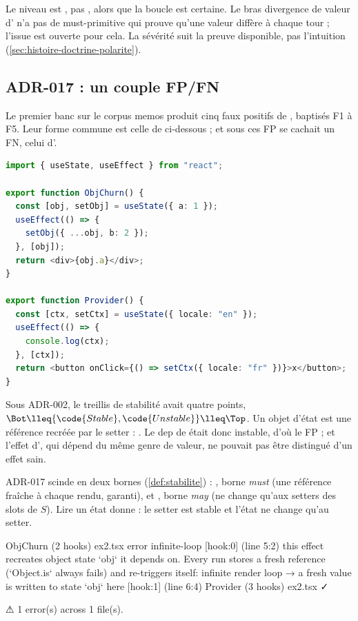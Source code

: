 \begin{remarque}
Le niveau est \Warning, pas \Error, alors que la boucle est certaine. Le bras \og divergence de valeur\fg{} d' n'a pas de must-primitive qui prouve qu'une valeur diffère à chaque tour ; l'issue  est ouverte pour cela. La sévérité suit la preuve disponible, pas l'intuition (\cref{sec:histoire-doctrine-polarite}).
\end{remarque}

\subsection{ADR-017 : un couple FP/FN}

Le premier banc sur le corpus \og memos\fg{} produit cinq faux positifs de , baptisés F1 à F5. Leur forme commune est celle de  ci-dessous ; et sous ces FP se cachait un FN, celui d'.

\begin{lstlisting}[language=TypeScript,caption={\file{/tmp/ch26/ex2.tsx}}]
import { useState, useEffect } from "react";

export function ObjChurn() {
  const [obj, setObj] = useState({ a: 1 });
  useEffect(() => {
    setObj({ ...obj, b: 2 });
  }, [obj]);
  return <div>{obj.a}</div>;
}

export function Provider() {
  const [ctx, setCtx] = useState({ locale: "en" });
  useEffect(() => {
    console.log(ctx);
  }, [ctx]);
  return <button onClick={() => setCtx({ locale: "fr" })}>x</button>;
}
\end{lstlisting}

Sous ADR-002, le treillis de stabilité avait quatre points, $\Bot \lleq \{\code{Stable}, \code{Unstable}\} \lleq \Top$. Un objet d'état est une référence recréée par le setter : . Le dep  de  était donc \og instable\fg{}, d'où le FP ; et l'effet d', qui dépend du même genre de valeur, ne pouvait pas être distingué d'un effet sain.

ADR-017 scinde  en deux bornes (\cref{def:stabilite}) : , borne \emph{must} (\og une référence fraîche à chaque rendu, garanti\fg{}), et , borne \emph{may} (\og ne change qu'aux setters des slots de $S$\fg{}). Lire un état donne  : le setter est stable et l'état ne change qu'au setter.

\begin{sortie}
  ObjChurn  (2 hooks)  ex2.tsx
    error  infinite-loop  [hook:0]  (line 5:2)  this effect recreates object state `obj` it depends on. Every run stores a fresh reference (`Object.is` always fails) and re-triggers itself: infinite render loop
       → a fresh value is written to state `obj` here [hook:1] (line 6:4)
  Provider  (3 hooks)  ex2.tsx  ✓

⚠  1 error(s) across 1 file(s).
\end{sortie}


